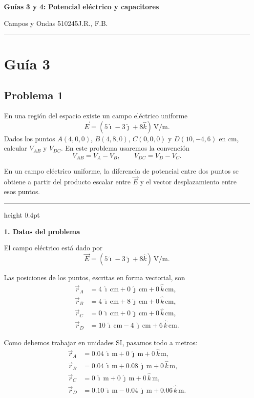 \documentclass[11pt]{article}
\newcommand{\encabezado}[3]{%
{\Large\bfseries #1\par}
\vspace{2pt}
{\normalsize #2\hfill #3\par}
\vspace{6pt}\hrule\vspace{8pt}}
\newcommand{\soluciontitulo}{%
  \par\medskip
  \noindent{\large\bfseries Solución.}\par
  \vspace{0.2em}\hrule height 0.4pt \vspace{0.7em}%
}
\begin{document}
\encabezado{Guías 3 y 4: Potencial eléctrico y capacitores}{Campos y Ondas 510245}{J.R., F.B.}
\shorthandoff{<>}

\section*{Gu\'ia 3}


\subsection*{Problema 1}
En una regi\'on del espacio existe un campo el\'ectrico uniforme
\begin{equation*}
    \vec E=(5\hat{\imath}-3\hat{\jmath}+8\hat{k})\,\text{V/m}.
\end{equation*}
Dados los puntos $A(4,0,0)$, $B(4,8,0)$, $C(0,0,0)$ y $D(10,-4,6)$ en cm, calcular $V_{AB}$ y $V_{DC}$. En este problema usaremos la convenci\'on
\begin{equation*}
    V_{AB}=V_A-V_B,
    \qquad
    V_{DC}=V_D-V_C.
\end{equation*}

\begin{comentario}
En un campo el\'ectrico uniforme, la diferencia de potencial entre dos puntos se obtiene a partir del producto escalar entre $\vec E$ y el vector desplazamiento entre esos puntos.
\end{comentario}

\soluciontitulo

\textbf{1. Datos del problema}

El campo el\'ectrico est\'a dado por
\begin{equation*}
    \vec E=(5\hat{\imath}-3\hat{\jmath}+8\hat{k})\,\text{V/m}.
\end{equation*}

Las posiciones de los puntos, escritas en forma vectorial, son
\begin{align*}
    \vec r_A&=4\,\hat{\imath}\,\text{cm}+0\,\hat{\jmath}\,\text{cm}+0\,\hat{k}\,\text{cm},\\
    \vec r_B&=4\,\hat{\imath}\,\text{cm}+8\,\hat{\jmath}\,\text{cm}+0\,\hat{k}\,\text{cm},\\
    \vec r_C&=0\,\hat{\imath}\,\text{cm}+0\,\hat{\jmath}\,\text{cm}+0\,\hat{k}\,\text{cm},\\
    \vec r_D&=10\,\hat{\imath}\,\text{cm}-4\,\hat{\jmath}\,\text{cm}+6\,\hat{k}\,\text{cm}.
\end{align*}

Como debemos trabajar en unidades SI, pasamos todo a metros:
\begin{align*}
    \vec r_A&=0.04\,\hat{\imath}\,\text{m}+0\,\hat{\jmath}\,\text{m}+0\,\hat{k}\,\text{m},\\
    \vec r_B&=0.04\,\hat{\imath}\,\text{m}+0.08\,\hat{\jmath}\,\text{m}+0\,\hat{k}\,\text{m},\\
    \vec r_C&=0\,\hat{\imath}\,\text{m}+0\,\hat{\jmath}\,\text{m}+0\,\hat{k}\,\text{m},\\
    \vec r_D&=0.10\,\hat{\imath}\,\text{m}-0.04\,\hat{\jmath}\,\text{m}+0.06\,\hat{k}\,\text{m}.
\end{align*}
\end{document}

